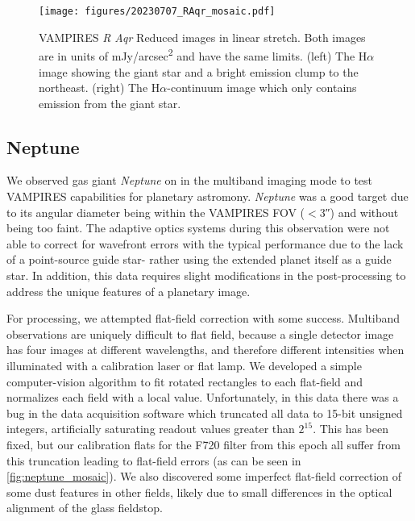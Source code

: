 \begin{figure}
    \centering
    \texttt{[image: figures/20230707\_RAqr\_mosaic.pdf]}
    \caption{ VAMPIRES \textit{R Aqr} Reduced images in linear stretch. Both images are in units of \si{mJy/arcsec^2} and have the same limits. (left) The H$\alpha$ image showing the giant star and a bright emission clump to the northeast. (right) The H$\alpha$-continuum image which only contains emission from the giant star.\label{fig:raqr_mosaic}}
\end{figure}

\subsection{Neptune\label{sec:neptune}}

We observed gas giant \textit{Neptune} on  in the multiband imaging mode to test VAMPIRES capabilities for planetary astromony. \textit{Neptune} was a good target due to its angular diameter being within the VAMPIRES FOV ($<$\ang{;;3}) and without being too faint. The adaptive optics systems during this observation were not able to correct for wavefront errors with the typical performance due to the lack of a point-source guide star- rather using the extended planet itself as a guide star. In addition, this data requires slight modifications in the post-processing to address the unique features of a planetary image.

For processing, we attempted flat-field correction with some success. Multiband observations are uniquely difficult to flat field, because a single detector image has four images at different wavelengths, and therefore different intensities when illuminated with a calibration laser or flat lamp. We developed a simple computer-vision algorithm to fit rotated rectangles to each flat-field and normalizes each field with a local value. Unfortunately, in this data there was a bug in the data acquisition software which truncated all data to 15-bit unsigned integers, artificially saturating readout values greater than $2^{15}$. This has been fixed, but our calibration flats for the F720 filter from this epoch all suffer from this truncation leading to flat-field errors (as can be seen in \autoref{fig:neptune_mosaic}). We also discovered some imperfect flat-field correction of some dust features in other fields, likely due to small differences in the optical alignment of the glass fieldstop.

